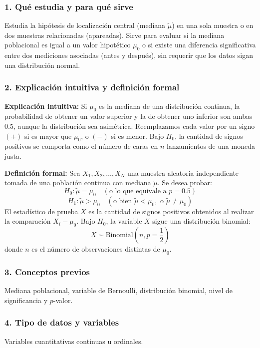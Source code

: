 \documentclass[11pt,a4paper]{article}
\begin{document}
\subsubsection{1. Qué estudia y para qué sirve}
Estudia la hipótesis de localización central (mediana $\tilde{\mu}$) en una sola muestra o en dos muestras relacionadas (apareadas). Sirve para evaluar si la mediana poblacional es igual a un valor hipotético $\mu_0$ o si existe una diferencia significativa entre dos mediciones asociadas (antes y después), sin requerir que los datos sigan una distribución normal.

\subsubsection{2. Explicación intuitiva y definición formal}
\textbf{Explicación intuitiva:} Si $\mu_0$ es la mediana de una distribución continua, la probabilidad de obtener un valor superior y la de obtener uno inferior son ambas $0.5$, aunque la distribución sea asimétrica. Reemplazamos cada valor por un signo $(+)$ si es mayor que $\mu_0$, o $(-)$ si es menor. Bajo $H_0$, la cantidad de signos positivos se comporta como el número de caras en $n$ lanzamientos de una moneda justa.

\textbf{Definición formal:} Sea $X_1, X_2, \dots, X_N$ una muestra aleatoria independiente tomada de una población continua con mediana $\tilde{\mu}$. Se desea probar:
\[ H_0: \tilde{\mu} = \mu_0 \quad (\text{o lo que equivale a } p = 0.5) \]
\[ H_1: \tilde{\mu} > \mu_0 \quad (\text{o bien } \tilde{\mu} < \mu_0, \text{ o } \tilde{\mu} \neq \mu_0) \]
El estadístico de prueba $X$ es la cantidad de signos positivos obtenidos al realizar la comparación $X_i - \mu_0$. Bajo $H_0$, la variable $X$ sigue una distribución binomial:
\[ X \sim \text{Binomial}\left(n, p = \frac{1}{2}\right) \]
donde $n$ es el número de observaciones distintas de $\mu_0$.

\subsubsection{3. Conceptos previos}
Mediana poblacional, variable de Bernoulli, distribución binomial, nivel de significancia y $p$-valor.

\subsubsection{4. Tipo de datos y variables}
Variables cuantitativas continuas u ordinales.
\end{document}
